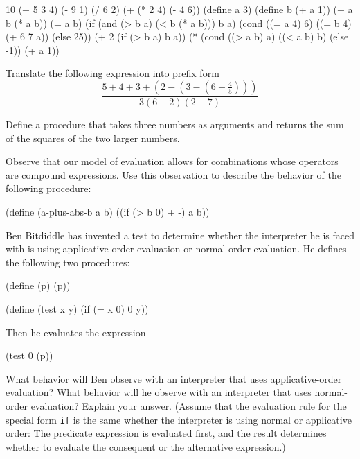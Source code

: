 \begin{schemedisplay}
\begin{Exercise}
\begin{schemedisplay}
10
(+ 5 3 4)
(- 9 1)
(/ 6 2)
(+ (* 2 4) (- 4 6))
(define a 3)
(define b (+ a 1))
(+ a b (* a b))
(= a b)
(if (and (> b a) (< b (* a b)))
    b
    a)
(cond ((= a 4) 6)
      ((= b 4) (+ 6 7 a))
      (else 25))
(+ 2 (if (> b a) b a))
(* (cond ((> a b) a)
         ((< a b) b)
         (else -1))
   (+ a 1))
\end{schemedisplay}
\end{Exercise}

\begin{Exercise}
\label{exc:1.2}
Translate the following expression into prefix form
\begin{equation*}
  \frac{5 + 4 + 3 + (2 - (3 - (6 + \frac{4}{5})))}
  {3 (6-2) (2-7)}
\end{equation*}
\end{Exercise}

\begin{Exercise}
\label{exc:1.3}
Define a procedure that takes three numbers as arguments and returns
the sum of the squares of the two larger numbers.
\end{Exercise}

\begin{Exercise}
\label{exc:1.4}
Observe that our model of evaluation allows for combinations whose
operators are compound expressions.  Use this observation to
describe the behavior of the following procedure:
\begin{schemedisplay}
(define (a-plus-abs-b a b)
  ((if (> b 0) + -) a b))
\end{schemedisplay}
\end{Exercise}

\begin{Exercise}
\label{exc:1.5}
Ben Bitdiddle has invented a test to determine whether the interpreter
he is faced with is using applicative-order evaluation or normal-order
evaluation.  He defines the following two procedures:

\begin{schemedisplay}
(define (p) (p))

(define (test x y)
  (if (= x 0)
      0
      y))
\end{schemedisplay}

Then he evaluates the expression

\begin{schemedisplay}
(test 0 (p))
\end{schemedisplay}

What behavior will Ben observe with an interpreter that uses
applicative-order evaluation?  What behavior will he observe with an
interpreter that uses normal-order evaluation?  Explain your answer.
(Assume that the evaluation rule for the special form \texttt{if} is
the same whether the interpreter is using normal or applicative order:
The predicate expression is evaluated first, and the result determines
whether to evaluate the consequent or the alternative expression.)
\end{Exercise}


\end{schemedisplay}
